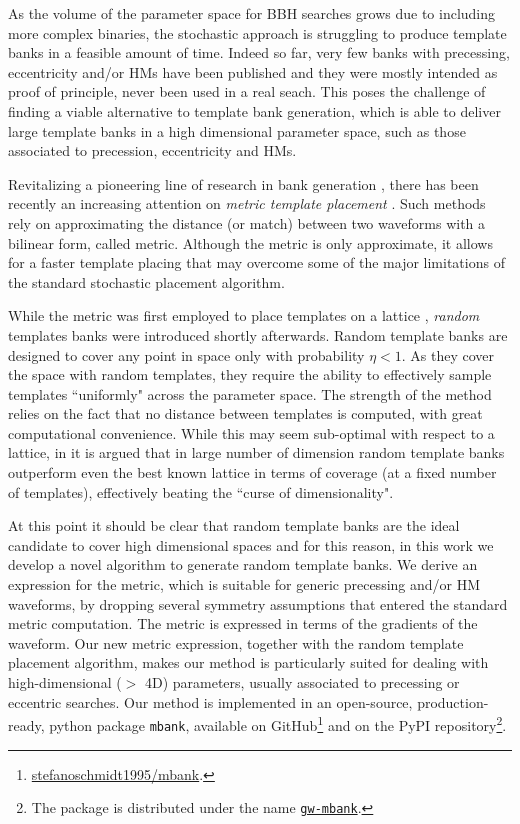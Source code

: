 \documentclass[twocolumn,showpacs,preprintnumbers,nofootinbib,prd,
superscriptaddress,10pt]{revtex4-2}
\begin{document}
As the volume of the parameter space for BBH searches grows due to including more complex binaries, the stochastic approach is struggling to produce template banks in a feasible amount of time.
Indeed so far, very few banks with precessing, eccentricity and/or HMs have been published \cite{Harry:2016ijz, Harry:2017weg} and they were  mostly intended as proof of principle, never been used in a real seach.
This poses the challenge of finding a viable alternative to template bank generation, which is able to deliver large template banks in a high dimensional parameter space, such as those associated to precession, eccentricity and HMs.

Revitalizing a pioneering line of research in bank generation \cite{owen_metric, Messenger:2008ta, Prix:2007ks, Brown:2012qf, Keppel:2013uma}, there has been recently an increasing attention on {\it metric template placement} \cite{Roy:2017oul, 2018cosp...42E2899R, Coogan:2022qxs, Hanna:2022zpk}.
Such methods rely on approximating the distance (or match) between two waveforms with a bilinear form, called metric.
Although the metric is only approximate, it allows for a faster template placing that may overcome some of the major limitations of the standard stochastic placement algorithm.

While the metric was first employed to place templates on a lattice \cite{owen_metric, Prix:2007ks}, {\it random} templates banks \cite{Messenger:2008ta} were introduced shortly afterwards.
Random template banks are designed to cover any point in space only with probability $\eta<1$. As they cover the space with random templates, they require the ability to effectively sample templates ``uniformly" across the parameter space.
The strength of the method relies on the fact that no distance between templates is computed, with great computational convenience.
While this may seem sub-optimal with respect to a lattice, in \cite{Messenger:2008ta, Allen:2022lqr, Allen:2021yuy} it is argued that in large number of dimension random template banks outperform even the best known lattice in terms of coverage (at a fixed number of templates), effectively beating the ``curse of dimensionality".

At this point it should be clear that random template banks are the ideal candidate to cover high dimensional spaces and for this reason, in this work we develop a novel algorithm to generate random template banks.
We derive an expression for the metric, which is suitable for generic precessing and/or HM waveforms, by dropping several symmetry assumptions that entered the standard metric computation. The metric is expressed in terms of the gradients of the waveform.
Our new metric expression, together with the random template placement algorithm, makes our method is particularly suited for dealing with high-dimensional ($>$ 4D) parameters, usually associated to precessing or eccentric searches.
Our method is implemented in an open-source, production-ready, python package \texttt{mbank}, available on GitHub\footnote{
\href{https://github.com/stefanoschmidt1995/mbank}{stefanoschmidt1995/mbank}.}
and on the PyPI repository\footnote{
The package is distributed under the name \texttt{\href{https://pypi.org/project/gw-mbank/}{gw-mbank}}.
}.
\end{document}
